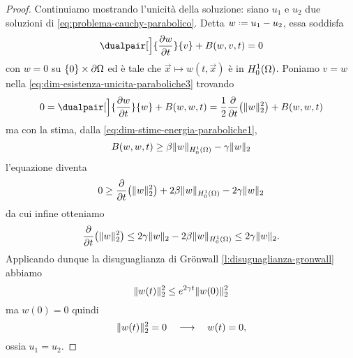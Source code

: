 \begin{proof}
    Continuiamo mostrando l'unicità della soluzione: siano $u_1$ e $u_2$ due soluzioni di \eqref{eq:problema-cauchy-parabolico}.
    Detta $w\defeq u_1-u_2$, essa soddisfa
    \begin{equation}
        \dualpair[\Big]{\drp{w}{t}}{v}+B(w,v,t)=0
        \label{eq:dim-esistenza-unicita-paraboliche3}
    \end{equation}
    con $w=0$ su $\{0\}\times\boundary\Omega$ ed è tale che $\vec x\mapsto w(t,\vec x)$ è in $\sobHc[1]{\Omega}$.
    Poniamo $v=w$ nella \eqref{eq:dim-esistenza-unicita-paraboliche3} trovando
    \begin{equation}
        0=
        \dualpair[\Big]{\drp{w}{t}}{w}+B(w,w,t)=
        \frac12\drp{}{t}\bigl(\norm{w}_2^2\bigr)+B(w,w,t)
    \end{equation}
    ma con la stima, dalla \eqref{eq:dim-stime-energia-paraboliche1},
    \begin{equation}
        B(w,w,t)\ge\beta\norm{w}_{\sobHc[1]{\Omega}}-\gamma\norm{w}_2
    \end{equation}
    l'equazione diventa
    \begin{equation}
        0\ge
        \drp{}{t}\bigl(\norm{w}_2^2\bigr)+2\beta\norm{w}_{\sobHc[1]{\Omega}}-2\gamma\norm{w}_2
    \end{equation}
    da cui infine otteniamo
    \begin{equation}
        \drp{}{t}\bigl(\norm{w}_2^2\bigr)\le
        2\gamma\norm{w}_2-2\beta\norm{w}_{\sobHc[1]{\Omega}}\le
        2\gamma\norm{w}_2.
    \end{equation}
    Applicando dunque la disuguaglianza di Grönwall \ref{l:disuguaglianza-gronwall} abbiamo
    \begin{equation}
        \norm{w(t)}_2^2\le e^{2\gamma t}\norm{w(0)}_2^2
    \end{equation}
    ma $w(0)=0$ quindi
    \begin{equation}
        \norm{w(t)}_2^2=0
        \qqq
        w(t)=0,
    \end{equation}
    ossia $u_1=u_2$.
\end{proof}

